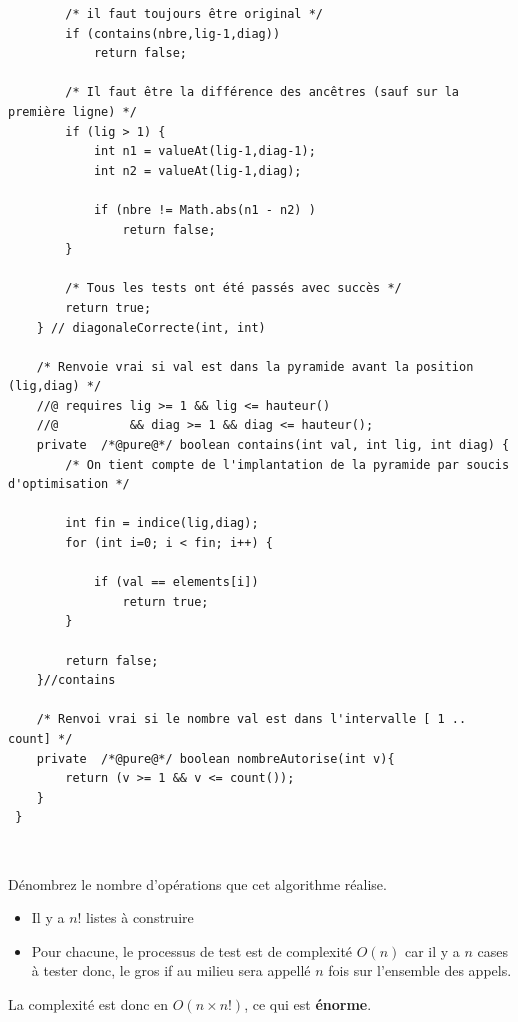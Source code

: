 \documentclass[10pt]{article}\usepackage[correction,nu]{esial}
\begin{document}
\begin{Reponse}
\begin{verbatim}
        /* il faut toujours être original */
        if (contains(nbre,lig-1,diag)) 
            return false;

        /* Il faut être la différence des ancêtres (sauf sur la première ligne) */
        if (lig > 1) {
            int n1 = valueAt(lig-1,diag-1);
            int n2 = valueAt(lig-1,diag);

            if (nbre != Math.abs(n1 - n2) )
                return false;
        }

        /* Tous les tests ont été passés avec succès */
        return true;
    } // diagonaleCorrecte(int, int)

    /* Renvoie vrai si val est dans la pyramide avant la position (lig,diag) */
    //@ requires lig >= 1 && lig <= hauteur() 
    //@          && diag >= 1 && diag <= hauteur();
    private  /*@pure@*/ boolean contains(int val, int lig, int diag) {
        /* On tient compte de l'implantation de la pyramide par soucis d'optimisation */

        int fin = indice(lig,diag);
        for (int i=0; i < fin; i++) {

            if (val == elements[i])
                return true;
        }

        return false;
    }//contains

    /* Renvoi vrai si le nombre val est dans l'intervalle [ 1 .. count] */
    private  /*@pure@*/ boolean nombreAutorise(int v){
        return (v >= 1 && v <= count());
    } 
 }

\end{verbatim}\vspace{-2\baselineskip}~
\end{Reponse}
\begin{Question}
  Dénombrez le nombre d'opérations que cet algorithme réalise.
\end{Question}
\begin{Reponse}
  \begin{itemize}
  \item Il y a $n!$ listes à construire
  \item Pour chacune, le processus de test est de complexité $O(n)$ car il y a
    $n$ cases à tester donc, le gros if au milieu sera appellé $n$ fois sur
    l'ensemble des appels.
  \end{itemize}
  La complexité est donc en $O(n\times n!)$, ce qui est \textbf{énorme}.
\end{Reponse}
\end{document}
